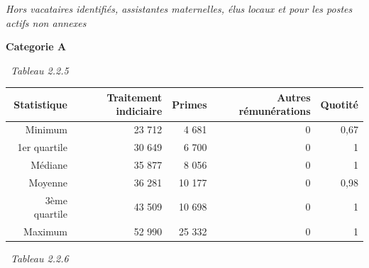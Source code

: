 \emph{Hors vacataires identifiés, assistantes maternelles, élus locaux
et pour les postes actifs non annexes}

\textbf{Categorie A}

~\emph{Tableau 2.2.5}

\begin{longtable}[]{@{}rrrrr@{}}
\toprule
Statistique & Traitement indiciaire & Primes & Autres rémunérations &
Quotité\tabularnewline
\midrule
\endhead
Minimum & 23 712 & 4 681 & 0 & 0,67\tabularnewline
1er quartile & 30 649 & 6 700 & 0 & 1\tabularnewline
Médiane & 35 877 & 8 056 & 0 & 1\tabularnewline
Moyenne & 36 281 & 10 177 & 0 & 0,98\tabularnewline
3ème quartile & 43 509 & 10 698 & 0 & 1\tabularnewline
Maximum & 52 990 & 25 332 & 0 & 1\tabularnewline
\bottomrule
\end{longtable}

~\emph{Tableau 2.2.6}

